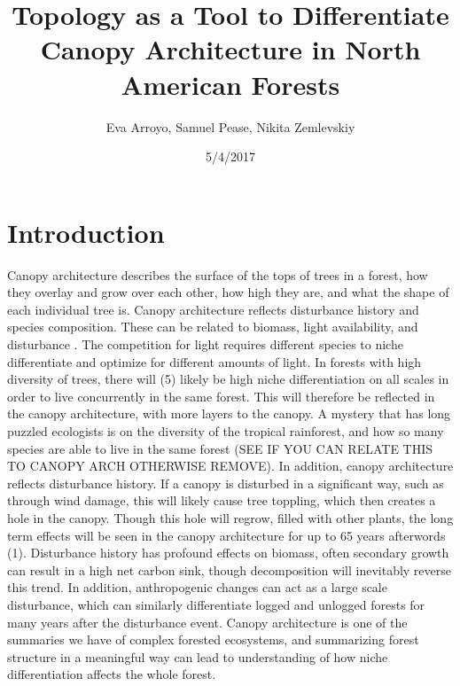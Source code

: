 \documentclass[10pt]{article}
\title{ Topology as a Tool to Differentiate Canopy Architecture in North American Forests }
\author{ Eva Arroyo, Samuel Pease, Nikita Zemlevskiy}
\date{5/4/2017}
\begin{document}
\maketitle
\newpage
\section*{Introduction}

\indent Canopy architecture describes the surface of the tops of trees in a forest, how they overlay and grow over each other, how high they are, and what the shape of each individual tree is. Canopy architecture reflects disturbance history and species composition. These can be related to biomass, light availability, and disturbance \cite{1}.  The competition for light requires different species to niche differentiate and optimize for different amounts of light. In forests with high diversity of trees, there will (5) likely be high niche differentiation on all scales in order to live concurrently in the same forest. This will therefore be reflected in the canopy architecture, with more layers to the canopy. A mystery that has long puzzled ecologists is on the diversity of the tropical rainforest, and how so many species are able to live in the same forest (SEE IF YOU CAN RELATE THIS TO CANOPY ARCH OTHERWISE REMOVE). In addition, canopy architecture reflects disturbance history. If a canopy is disturbed in a significant way, such as through wind damage, this will likely cause tree toppling, which then creates a hole in the canopy. Though this hole will regrow, filled with other plants, the long term effects will be seen in the canopy architecture for up to 65 years afterwords (1). Disturbance history has profound effects on biomass, often secondary growth can result in a high net carbon sink, though decomposition will inevitably reverse this trend. In addition, anthropogenic changes can act as a large scale disturbance, which can similarly differentiate logged and unlogged forests for many years after the disturbance event. Canopy architecture is one of the summaries we have of complex forested ecosystems, and summarizing forest structure in a meaningful way can lead to understanding of how niche differentiation affects the whole forest.
\end{document}

